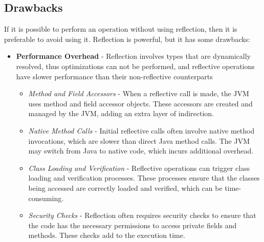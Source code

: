 \subsection{Drawbacks}
If it is possible to perform an operation without using reflection, then it is
preferable to avoid using it. Reflection is powerful, but it has some drawbacks:
\begin{itemize}
    \item \textbf{Performance Overhead} - Reflection involves types that are dynamically resolved, thus optimizations
    can not be performed, and reflective operations have slower performance
    than their non-reflective counterparts
    \begin{itemize}
    	\item \textit{Method and Field Accessors} - When a reflective call is made, the JVM uses method and field accessor objects. These accessors are created and managed by the JVM, adding an extra layer of indirection.
    	\item \textit{Native Method Calls} - Initial reflective calls often involve native method invocations, which are slower than direct Java method calls. The JVM may switch from Java to native code, which incurs additional overhead.
    	\item \textit{Class Loading and Verification} - Reflective operations can trigger class loading and verification processes. These processes ensure that the classes being accessed are correctly loaded and verified, which can be time-consuming.
    	\item \textit{Security Checks} - Reflection often requires security checks to ensure that the code has the necessary permissions to access private fields and methods. These checks add to the execution time.
    \end{itemize}
    \nl
    
\end{itemize}
